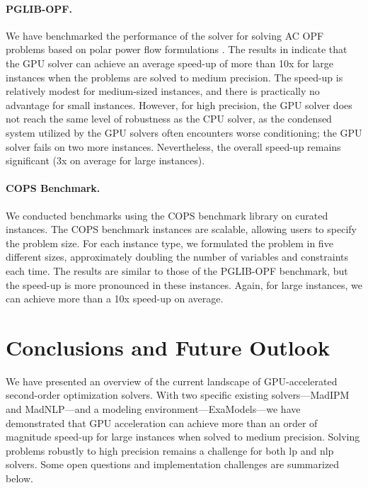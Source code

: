 \documentclass{article}
\begin{document}
\paragraph{PGLIB-OPF.}
We have benchmarked the performance of the solver for solving AC OPF problems based on polar power flow formulations \cite{PowerModelsJLOpenSource}. The results in  indicate that the GPU solver can achieve an average speed-up of more than 10x for large instances when the problems are solved to medium precision. The speed-up is relatively modest for medium-sized instances, and there is practically no advantage for small instances. However, for high precision, the GPU solver does not reach the same level of robustness as the CPU solver, as the condensed system utilized by the GPU solvers often encounters worse conditioning; the GPU solver fails on two more instances. Nevertheless, the overall speed-up remains significant (3x on average for large instances).

\paragraph{COPS Benchmark.}
We conducted benchmarks using the COPS benchmark library on curated instances. The COPS benchmark instances are scalable, allowing users to specify the problem size. For each instance type, we formulated the problem in five different sizes, approximately doubling the number of variables and constraints each time. The results are similar to those of the PGLIB-OPF benchmark, but the speed-up is more pronounced in these instances. Again, for large instances, we can achieve more than a 10x speed-up on average.

\section{Conclusions and Future Outlook}\label{sec:conclusion}
We have presented an overview of the current landscape of GPU-accelerated second-order optimization solvers. With two specific existing solvers—MadIPM and MadNLP—and a modeling environment---ExaModels---we have demonstrated that GPU acceleration can achieve more than an order of magnitude speed-up for large instances when solved to medium precision. Solving problems robustly to high precision remains a challenge for both \gls*{lp} and \gls*{nlp} solvers. Some open questions and implementation challenges are summarized below.
\end{document}

